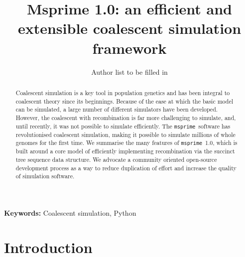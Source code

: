 \documentclass{article}
\newcommand{\msprime}[0]{\texttt{msprime}}
\begin{document}
\title{Msprime 1.0: an efficient and extensible coalescent simulation framework}
\author{Author list to be filled in
}


\maketitle

\begin{abstract}
Coalescent simulation is a key tool in population genetics and
has been integral to coalescent theory since its beginnings.
Because of the ease at which the basic model can be simulated,
a large number of different simulators have been developed. However,
the coalescent with recombination is far more challenging to simulate,
and, until recently, it was not possible to simulate efficiently.
The \msprime\ software has revolutionised
coalescent simulation, making it possible to simulate millions
of whole genomes for the first time. We summarise the many features
of \msprime\ 1.0, which is built around a core model of efficiently
implementing recombination via the succinct tree sequence data
structure. We advocate a community oriented open-source development
process as a way to reduce duplication of effort and increase
the quality of simulation software.
\end{abstract}


\textbf{Keywords:} Coalescent simulation, Python

\section*{Introduction}
\end{document}
